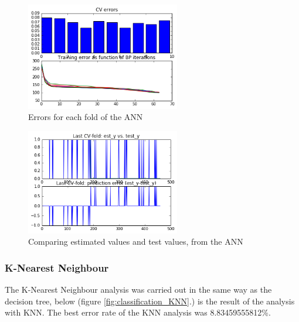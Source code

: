 \vspace{-5pt}
\begin{figure}[!ht]
	\centering
	\includegraphics[width=0.6\textwidth]{Fig/classification_ANN_1}
	\vspace{-5pt}
	\caption{Errors for each fold of the ANN}
	\label{fig:classification_ANN}
\end{figure}

\vspace{-5pt}
\begin{figure}[!ht]
	\centering
	\includegraphics[width=0.6\textwidth]{Fig/classification_ANN_2}
	\vspace{-5pt}
	\caption{Comparing estimated values and test values, from the ANN}
	\label{fig:classification_ANN2}
\end{figure}

\newpage
\subsubsection{K-Nearest Neighbour}
The K-Nearest Neighbour analysis was carried out in the same way as the decision tree, below (figure \ref{fig:classification_KNN}.) is the result of the analysis with KNN. The best error rate of the KNN analysis was 8.83459555812\%.

